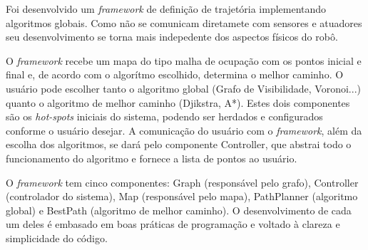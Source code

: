 Foi desenvolvido um \textit{framework} de definição de trajetória implementando algoritmos globais. Como não se comunicam diretamete com sensores e atuadores seu desenvolvimento se torna mais indepedente dos aspectos físicos do robô.

O \textit{framework} recebe um mapa do tipo malha de ocupação com os pontos inicial e final e, de acordo com o algorítmo escolhido, determina o melhor caminho. O usuário pode escolher tanto o algoritmo global (Grafo de Visibilidade, Voronoi...) quanto o algoritmo de melhor caminho (Djikstra, A*). Estes dois componentes são os \textit{hot-spots} iniciais do sistema, podendo ser herdados e configurados conforme o usuário desejar. A comunicação do usuário com o \textit{framework}, além da escolha dos algoritmos, se dará pelo componente Controller, que abstrai todo o funcionamento do algoritmo e fornece a lista de pontos ao usuário.

O \textit{framework} tem cinco componentes: Graph (responsável pelo grafo), Controller (controlador do sistema), Map (responsável pelo mapa), PathPlanner (algoritmo global) e BestPath (algoritmo de melhor caminho). O desenvolvimento de cada um deles é embasado em boas práticas de programação e voltado à clareza e simplicidade do código.
